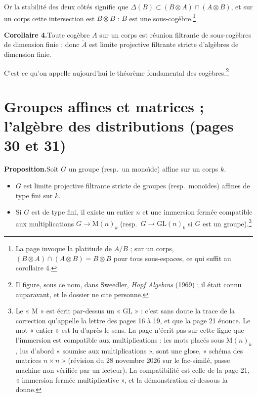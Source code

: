 \documentclass[11pt,a4paper]{article}
\begin{document}
Or la stabilité des deux côtés signifie que $\Delta(B) \subset (B \otimes A)
\cap (A \otimes B)$, et sur un corps cette intersection est $B \otimes B$ :
$B$ est une sous-cogèbre.\footnote{La page invoque la platitude de $A/B$ ;
sur un corps, $(B \otimes A) \cap (A \otimes B) = B \otimes B$ pour tous
sous-espaces, ce qui suffit au corollaire 4.}

\textbf{Corollaire 4.}\quad Toute cogèbre $A$ sur un corps est réunion filtrante de sous-cogèbres de
dimension finie ; donc $\check{A}$ est limite projective filtrante stricte
d'algèbres de dimension finie.

C'est ce qu'on appelle aujourd'hui le théorème fondamental des
cogèbres.\footnote{Il figure, sous ce nom, dans Sweedler, \emph{Hopf
Algebras} (1969) ; il était connu auparavant, et le dossier ne cite
personne.}

\section*{Groupes affines et matrices ; l'algèbre des distributions (pages 30 et 31)}

\textbf{Proposition.}\quad Soit $G$ un groupe (resp.\ un monoïde) affine sur un corps $k$.
\begin{itemize}
\item[a)] $G$ est limite projective filtrante stricte de groupes (resp.\
monoïdes) affines de type fini sur $k$.
\item[b)] Si $G$ est de type fini, il existe un entier $n$ et une immersion
fermée compatible aux multiplications $G \to \mathrm{M}(n)_{k}$ (resp.\
$G \to \mathrm{GL}(n)_{k}$ si $G$ est un groupe).\footnote{Le « $\mathrm{M}$ »
est écrit par-dessus un « $\mathrm{GL}$ » : c'est sans doute la trace de la
correction qu'appelle la lettre des pages 16 à 19, et que la page 21
énonce. Le mot « entier » est lu d'après le sens. La page n'écrit pas sur cette
ligne que l'immersion est compatible aux multiplications : les mots placés sous
$\mathrm{M}(n)_{k}$, lus d'abord « soumise aux multiplications », sont une
glose, « schéma des matrices $n \times n$ » (révision du 28 novembre 2026 sur
le fac-similé, passe machine non vérifiée par un lecteur). La compatibilité est
celle de la page 21, « immersion fermée multiplicative », et la démonstration
ci-dessous la donne.}
\end{itemize}
\end{document}

